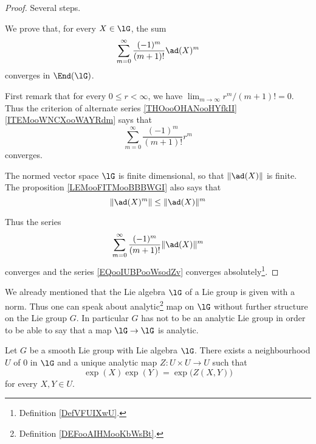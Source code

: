 \begin{proof}
	Several steps.
	\begin{subproof}
		We prove that, for every \( X\in\lG\), the sum
		\begin{equation}		\label{EQooIUBPooWsodZv}
			\sum_{m=0}^{\infty}\frac{ (-1)^m }{ (m+1)! }\ad(X)^m
		\end{equation}
		converges in \( \End(\lG)\).

		First remark that for every \( 0\leq r<\infty\), we have \( \lim_{m\to\infty}r^m/(m+1)!=0\). Thus the criterion of alternate series \ref{THOooOHANooHYfkII}\ref{ITEMooWNCXooWAYRdm} says that
		\begin{equation}
			\sum_{m=0}^{\infty}\frac{ (-1)^m }{ (m+1)! }r^m
		\end{equation}
		converges.

		The normed vector space \( \lG\) is finite dimensional, so that \( \| \ad(X) \|\) is finite. The proposition \ref{LEMooFITMooBBBWGI} also says that
		\begin{equation}
			\| \ad(X)^m \|\leq \| \ad(X) \|^m
		\end{equation}
	\end{subproof}
	Thus the series
	\begin{equation}
		\sum_{m=0}^{\infty}\frac{ (-1)^m }{ (m+1)! }\| \ad(X) \|^m
	\end{equation}
	converges and the series \eqref{EQooIUBPooWsodZv} converges absolutely\footnote{Definition \ref{DefVFUIXwU}.}.

\end{proof}


\begin{normaltext}
	We already mentioned that the Lie algebra \( \lG\) of a Lie group is given with a norm. Thus one can speak about analytic\footnote{Definition \ref{DEFooAIHMooKbWsBt}.} map on \( \lG\) without further structure on the Lie group \( G\). In particular \( G\) has not to be an analytic Lie group in order to be able to say that a map \( \lG\to \lG\) is analytic.
\end{normaltext}

\begin{theorem}     \label{THOooYJPEooSpKHnC}
	Let \( G\) be a smooth Lie group with Lie algebra \( \lG\). There exists a neighbourhood \( U\) of \( 0\) in \( \lG\) and a unique analytic map \(Z \colon U\times U\to U \) such that
	\begin{equation}
		\exp(X)\exp(Y)=\exp\big( Z(X,Y) \big)
	\end{equation}
	for every \( X,Y\in U\).

\end{theorem}

